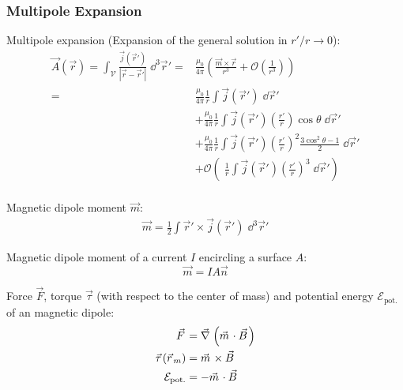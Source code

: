 		\subsubsection{Multipole Expansion}
			\noindent
			Multipole expansion (Expansion of the general solution in $r'/r \rightarrow 0$):
			\begin{equation}
				\begin{aligned}
					\vec{A}(\vec{r}) = \int_{\mathcal{V}} \frac{\vec{j}(\vec{r}')}{\left|\vec{r}-\vec{r}'\right|} \;\dd^3\vec{r}'
					=& \frac{\mu_0}{4\pi} \left(\frac{\vec{m}\times\vec{r}}{r^3} + \mathcal{O}\left(\frac{1}{r^3}\right)\right) \\
					=& \frac{\mu_0}{4\pi}\frac{1}{r}\int\vec{j}(\vec{r}')\;\dd \vec{r}' \\
					&+ \frac{\mu_0}{4\pi}\frac{1}{r}\int\vec{j}(\vec{r}')\left(\frac{r'}{r}\right)\cos\theta\;\dd \vec{r}' \\
					&+ \frac{\mu_0}{4\pi}\frac{1}{r}\int\vec{j}(\vec{r}')\left(\frac{r'}{r}\right)^2\frac{3\cos^2\theta-1}{2}\;\dd \vec{r}' \\
					&+ \mathcal{O}\left(\;\frac{1}{r}\int\vec{j}(\vec{r}')\left(\frac{r'}{r}\right)^3 \;\dd \vec{r}'\right) \\
				\end{aligned}
			\end{equation}

			\noindent
			Magnetic dipole moment $\vec{m}$:
			\begin{equation}
				\begin{aligned}
					\vec{m} = \frac{1}{2}\int \vec{r}'\times\vec{j}(\vec{r}')\;\dd^3\vec{r}'
				\end{aligned}
			\end{equation}

			\noindent
			Magnetic dipole moment of a current $I$ encircling a surface $A$:
			\begin{equation}
				\vec{m} = IA\vec{n}
			\end{equation}


			\noindent
			Force $\vec{F}$, torque $\vec{\tau}$ (with respect to the center of mass) and potential energy $\mathcal{E}_\text{pot.}$ of an magnetic dipole:
			\begin{equation}
				\begin{aligned}
					\vec{F} &= \Nabla\left(\vec{m}\cdot\vec{B}\right) \\
					\vec{\tau}(\vec{r}_m) &= \vec{m}\times\vec{B} \\
					\mathcal{E}_\text{pot.} &= -\vec{m}\cdot\vec{B} \\
				\end{aligned}
				\label{Eq:MagneticDipoleInteraction}
			\end{equation}

